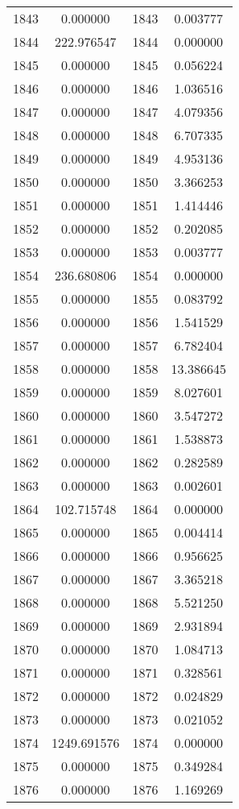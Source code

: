 \documentclass[12pt]{article}
\begin{document}
\begin{longtable}{@{}cccc@{}}
1843 & 0.000000 & 1843 & 0.003777 \\
1844 & 222.976547 & 1844 & 0.000000 \\
1845 & 0.000000 & 1845 & 0.056224 \\
1846 & 0.000000 & 1846 & 1.036516 \\
1847 & 0.000000 & 1847 & 4.079356 \\
1848 & 0.000000 & 1848 & 6.707335 \\
1849 & 0.000000 & 1849 & 4.953136 \\
1850 & 0.000000 & 1850 & 3.366253 \\
1851 & 0.000000 & 1851 & 1.414446 \\
1852 & 0.000000 & 1852 & 0.202085 \\
1853 & 0.000000 & 1853 & 0.003777 \\
1854 & 236.680806 & 1854 & 0.000000 \\
1855 & 0.000000 & 1855 & 0.083792 \\
1856 & 0.000000 & 1856 & 1.541529 \\
1857 & 0.000000 & 1857 & 6.782404 \\
1858 & 0.000000 & 1858 & 13.386645 \\
1859 & 0.000000 & 1859 & 8.027601 \\
1860 & 0.000000 & 1860 & 3.547272 \\
1861 & 0.000000 & 1861 & 1.538873 \\
1862 & 0.000000 & 1862 & 0.282589 \\
1863 & 0.000000 & 1863 & 0.002601 \\
1864 & 102.715748 & 1864 & 0.000000 \\
1865 & 0.000000 & 1865 & 0.004414 \\
1866 & 0.000000 & 1866 & 0.956625 \\
1867 & 0.000000 & 1867 & 3.365218 \\
1868 & 0.000000 & 1868 & 5.521250 \\
1869 & 0.000000 & 1869 & 2.931894 \\
1870 & 0.000000 & 1870 & 1.084713 \\
1871 & 0.000000 & 1871 & 0.328561 \\
1872 & 0.000000 & 1872 & 0.024829 \\
1873 & 0.000000 & 1873 & 0.021052 \\
1874 & 1249.691576 & 1874 & 0.000000 \\
1875 & 0.000000 & 1875 & 0.349284 \\
1876 & 0.000000 & 1876 & 1.169269 \\

\end{longtable}
\end{document}
